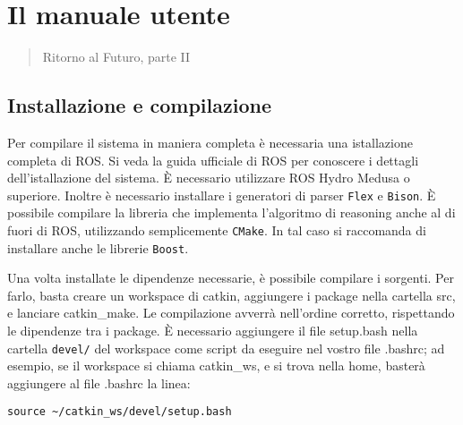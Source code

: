 \chapter{Il manuale utente}
\label{app:manuale}
\thispagestyle{empty}

\begin{quotation}
{\footnotesize
{}
\begin{flushright}
Ritorno al Futuro, parte II
\end{flushright}
}
\end{quotation}
\vspace{0.5cm}

\section{Installazione e compilazione}

Per compilare il sistema in maniera completa è necessaria una istallazione completa di ROS. Si veda la guida ufficiale di ROS per conoscere i dettagli dell'istallazione del sistema. \`E necessario utilizzare ROS Hydro Medusa o superiore.  %
Inoltre è necessario installare i generatori di parser \verb|Flex| e \verb|Bison|.
\`E possibile compilare la libreria che implementa l'algoritmo di reasoning anche al di fuori di ROS, utilizzando semplicemente \verb|CMake|. In tal caso si raccomanda di installare anche le librerie \verb|Boost|.

Una volta installate le dipendenze necessarie, è possibile compilare i sorgenti. Per farlo, basta creare un workspace di catkin, aggiungere i package nella cartella src, e lanciare catkin\_make. Le compilazione avverrà nell'ordine corretto, rispettando le dipendenze tra i package.
\`E necessario aggiungere il file setup.bash nella cartella \verb|devel/| del workspace come script da eseguire nel vostro file .bashrc; ad esempio, se il workspace  si chiama catkin\_ws, e si trova nella home, basterà aggiungere al file .bashrc la linea:
\begin{verbatim}
source ~/catkin_ws/devel/setup.bash
\end{verbatim}

